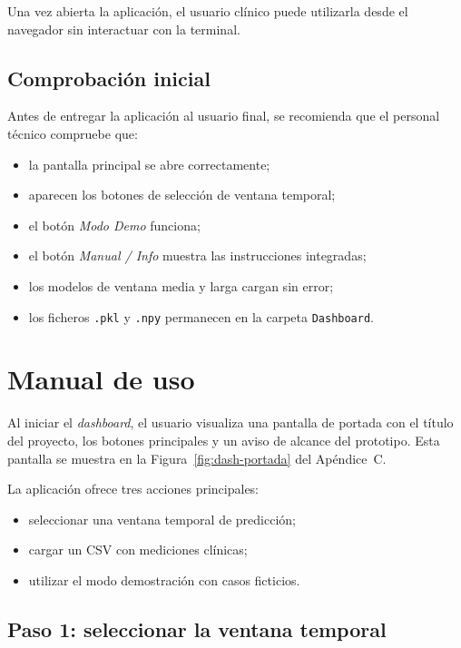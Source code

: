 \documentclass[
  spanish,
  a4paper,
  12pt,
  twoside]{memoir}
\begin{document}
Una vez abierta la aplicación, el usuario clínico puede utilizarla desde el navegador sin interactuar con la terminal.

\subsection*{Comprobación inicial}

Antes de entregar la aplicación al usuario final, se recomienda que el personal técnico compruebe que:

\begin{itemize}
  \item la pantalla principal se abre correctamente;
  \item aparecen los botones de selección de ventana temporal;
  \item el botón \emph{Modo Demo} funciona;
  \item el botón \emph{Manual / Info} muestra las instrucciones integradas;
  \item los modelos de ventana media y larga cargan sin error;
  \item los ficheros \texttt{.pkl} y \texttt{.npy} permanecen en la carpeta \texttt{Dashboard}.
\end{itemize}

\section{Manual de uso}

Al iniciar el \textit{dashboard}, el usuario visualiza una pantalla de portada con el título del proyecto, los botones principales y un aviso de alcance del prototipo. Esta pantalla se muestra 
en la Figura~\ref{fig:dash-portada} del Apéndice~C.

La aplicación ofrece tres acciones principales:

\begin{itemize}
  \item seleccionar una ventana temporal de predicción;
  \item cargar un CSV con mediciones clínicas;
  \item utilizar el modo demostración con casos ficticios.
\end{itemize}

\subsection*{Paso 1: seleccionar la ventana temporal}
\end{document}
